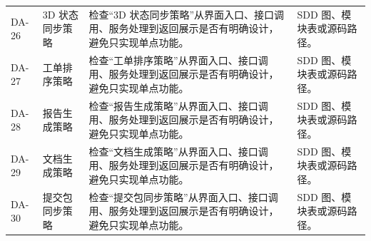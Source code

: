 \documentclass[12pt,a4paper]{ctexart}
\begin{document}
\begin{longtable}{L{1.7cm}L{4.0cm}L{6.2cm}L{3.6cm}}
DA-26 & 3D 状态同步策略 & 检查“3D 状态同步策略”从界面入口、接口调用、服务处理到返回展示是否有明确设计，避免只实现单点功能。 & SDD 图、模块表或源码路径。 \\
DA-27 & 工单排序策略 & 检查“工单排序策略”从界面入口、接口调用、服务处理到返回展示是否有明确设计，避免只实现单点功能。 & SDD 图、模块表或源码路径。 \\
DA-28 & 报告生成策略 & 检查“报告生成策略”从界面入口、接口调用、服务处理到返回展示是否有明确设计，避免只实现单点功能。 & SDD 图、模块表或源码路径。 \\
DA-29 & 文档生成策略 & 检查“文档生成策略”从界面入口、接口调用、服务处理到返回展示是否有明确设计，避免只实现单点功能。 & SDD 图、模块表或源码路径。 \\
DA-30 & 提交包同步策略 & 检查“提交包同步策略”从界面入口、接口调用、服务处理到返回展示是否有明确设计，避免只实现单点功能。 & SDD 图、模块表或源码路径。 \\
\bottomrule
\end{longtable}
\end{document}
